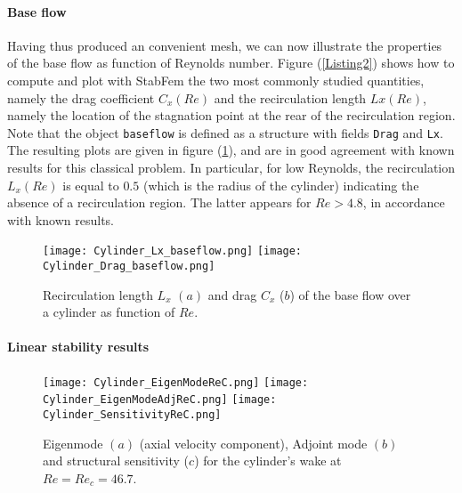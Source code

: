 \documentclass[twocolumn,10pt]{asme2ej}
\begin{document}
\paragraph{Base flow}

Having thus produced an convenient mesh, we can now illustrate the properties of the base flow as function of Reynolds number. Figure (\ref{Listing2}) shows how to compute and plot with StabFem the two most commonly studied quantities, namely the drag coefficient $C_x(Re)$  and the recirculation length $Lx(Re)$, namely the location of the stagnation point at the rear of the recirculation region. 
Note that the object \verb|baseflow| is defined as a structure with fields \verb|Drag| and \verb|Lx|. 
The resulting plots are given in figure (\ref{fig:LxandDrag}), and are in good agreement with known results for this classical problem.
In particular, for low Reynolds, the recirculation $L_x(Re)$ is equal to $0.5$ (which is the radius of the cylinder) indicating the absence of a recirculation region. The latter appears for $Re > 4.8$, in accordance with known results.






\begin{figure}
\texttt{[image: Cylinder\_Lx\_baseflow.png]}
\texttt{[image: Cylinder\_Drag\_baseflow.png]}
\caption{Recirculation length $L_x$ $(a)$  and drag $C_x$ ($b$) of the base flow over a cylinder as function of $Re$.}
\label{fig:LxandDrag}
\end{figure}


\paragraph{Linear stability results}



\begin{figure}
\texttt{[image: Cylinder\_EigenModeReC.png]}
\texttt{[image: Cylinder\_EigenModeAdjReC.png]}
\texttt{[image: Cylinder\_SensitivityReC.png]}
\caption{Eigenmode $(a)$  (axial velocity component),  Adjoint mode $(b)$ and structural sensitivity ($c$) for the cylinder's wake at $Re=Re_c = 46.7$.}
\label{fig:Eigenmode}
\end{figure}
\end{document}
